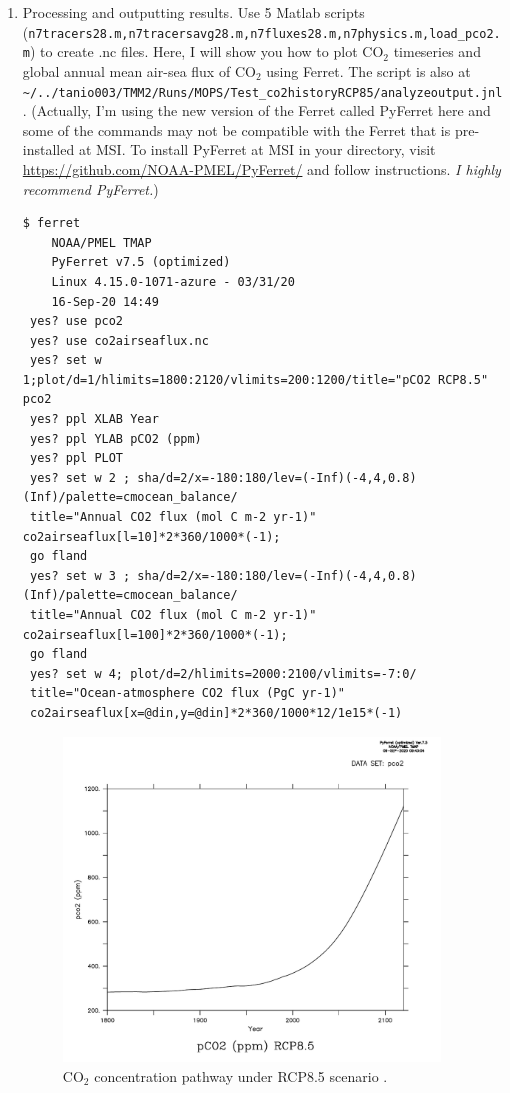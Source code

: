 \documentclass[a4paper]{article}
\begin{document}
\begin{enumerate}
\item Processing and outputting results. Use 5 Matlab scripts \\ (\verb|n7tracers28.m,n7tracersavg28.m,n7fluxes28.m,n7physics.m,load_pco2.m|) to create .nc files. Here, I will show you how to plot $\mathrm{CO_{2}}$ timeseries and global annual mean air-sea flux of $\mathrm{CO_{2}}$ using Ferret. The script is also at \verb|~/../tanio003/TMM2/Runs/MOPS/Test_co2historyRCP85/analyzeoutput.jnl|. (Actually, I'm using the new version of the Ferret called PyFerret here and some of the commands may not be compatible with the Ferret that is pre-installed at MSI. To install PyFerret at MSI in your directory, visit \url{https://github.com/NOAA-PMEL/PyFerret/} and follow instructions. \emph{I highly recommend PyFerret.})
\begin{lstlisting}[style=DOS]
 $ ferret
  	NOAA/PMEL TMAP
 	PyFerret v7.5 (optimized)
 	Linux 4.15.0-1071-azure - 03/31/20
 	16-Sep-20 14:49
 yes? use pco2
 yes? use co2airseaflux.nc
 yes? set w 1;plot/d=1/hlimits=1800:2120/vlimits=200:1200/title="pCO2 RCP8.5" pco2
 yes? ppl XLAB Year
 yes? ppl YLAB pCO2 (ppm)
 yes? ppl PLOT
 yes? set w 2 ; sha/d=2/x=-180:180/lev=(-Inf)(-4,4,0.8)(Inf)/palette=cmocean_balance/
 title="Annual CO2 flux (mol C m-2 yr-1)" co2airseaflux[l=10]*2*360/1000*(-1);
 go fland
 yes? set w 3 ; sha/d=2/x=-180:180/lev=(-Inf)(-4,4,0.8)(Inf)/palette=cmocean_balance/
 title="Annual CO2 flux (mol C m-2 yr-1)" co2airseaflux[l=100]*2*360/1000*(-1);
 go fland
 yes? set w 4; plot/d=2/hlimits=2000:2100/vlimits=-7:0/
 title="Ocean-atmosphere CO2 flux (PgC yr-1)" 
 co2airseaflux[x=@din,y=@din]*2*360/1000*12/1e15*(-1)
\end{lstlisting}

\begin{figure}[b!]   %
   \centering
   \includegraphics[width=10cm]{pco2RCP85.pdf}
   \caption[]{$\mathrm{CO_2}$ concentration pathway under RCP8.5 scenario \citep{Meinshausen11}.}
   \label{fig:pco2RCP85}
\end{figure}


\end{enumerate}
\end{document}
